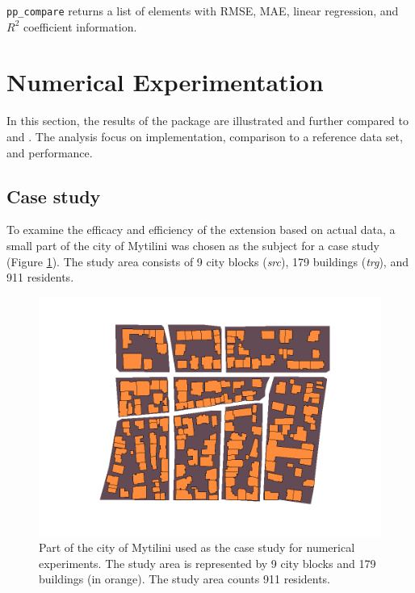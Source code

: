 \texttt{pp\_compare} returns a list of elements with RMSE, MAE, linear regression, and \(R^2\) coefficient
information.

\hypertarget{numerical-experimentation}{%
\section{Numerical Experimentation}\label{numerical-experimentation}}

In this section, the results of the  package are illustrated and further compared to  and . The analysis focus on implementation, comparison to a reference data set, and performance.

\hypertarget{case-study}{%
\subsection{Case study}\label{case-study}}

To examine the efficacy and efficiency of the  extension based on actual data, a small part of
the city of Mytilini was chosen as the subject for a case study (Figure \ref{fig:studyarea}). The study area consists of 9
city blocks (\emph{src}), 179 buildings (\emph{trg}), and 911 residents.

\begin{figure}
\includegraphics[width=1\linewidth]{img/study_area} \caption{Part of the city of Mytilini used as the case study for numerical experiments. The study area is represented by 9 city blocks and 179 buildings (in orange). The study area counts 911 residents.}\label{fig:studyarea}
\end{figure}


